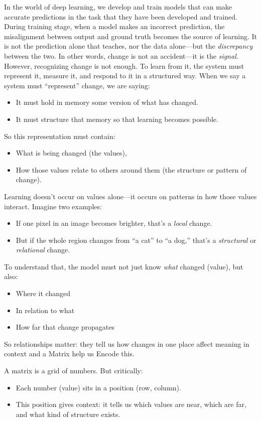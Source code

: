 In the world of deep learning, we develop and train models that can make accurate predictions in the task that they have been developed and trained. During training stage, when a model makes an incorrect prediction, the misalignment between output and ground truth becomes the source of learning. It is not the prediction alone that teaches, nor the data alone—but the \textit{discrepancy} between the two. In other words, change is not an accident—it is the \textit{signal}. However, recognizing change is not enough. To learn from it, the system must represent it, measure it, and respond to it in a structured way. When we say a system must “represent” change, we are saying:
\begin{itemize}
	\item It must hold in memory some version of what has changed.
	\item It must structure that memory so that learning becomes possible.
\end{itemize}

So this representation must contain:
\begin{itemize}
	\item What is being changed (the values),
	\item How those values relate to others around them (the structure or pattern of change).
\end{itemize}

Learning doesn’t occur on values alone—it occurs on patterns in how those values interact. Imagine two examples:
\begin{itemize}
	\item If one pixel in an image becomes brighter, that’s a \textit{local} change.
	\item But if the whole region changes from “a cat” to “a dog,” that’s a \textit{structural} or \textit{relational} change.
\end{itemize}
To understand that, the model must not just know \textit{what} changed (value), but also:
\begin{itemize}
	\item Where it changed
	\item In relation to what
	\item How far that change propagates
\end{itemize}
So relationships matter: they tell us how changes in one place affect meaning in context and a Matrix help us Encode this.  

A matrix is a grid of numbers. But critically:
\begin{itemize}
	\item Each number (value) sits in a position (row, column).
	\item This position gives context: it tells us which values are near, which are far, and what kind of structure exists.
\end{itemize}

